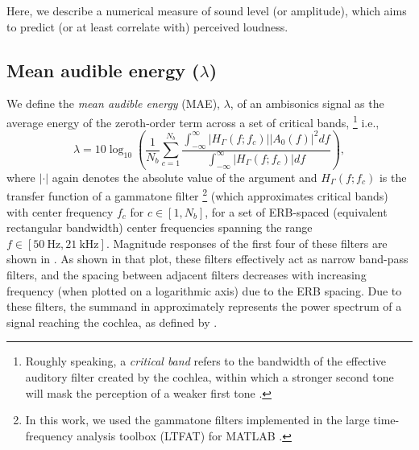 Here, we describe a numerical measure of sound level (or amplitude), which aims to predict (or at least correlate with) perceived loudness.

\subsection{Mean audible energy (\texorpdfstring{$\lambda$}{lambda})}\label{sec:04_Auditory_Models:Audible_Energy}
We define the \textit{mean audible energy} (MAE), $\lambda$, of an ambisonics signal as the average energy of the zeroth-order term across a set of critical bands,%
\footnote{Roughly speaking, a \textit{critical band} refers to the bandwidth of the effective auditory filter created by the cochlea, within which a stronger second tone will mask the perception of a weaker first tone \citep[chapter 3]{Moore2013}.}
 i.e.,
\begin{equation}\label{eq:04_Auditory_Models:Mean_Audible_Energy}
\lambda = 10 \log_{10} \left( \frac{1}{N_b} \sum_{c = 1}^{N_b} \frac{\displaystyle \int_{-\infty}^\infty |H_\Gamma(f;f_c)| |A_0(f)|^2 df}{\displaystyle \int_{-\infty}^\infty |H_\Gamma(f;f_c)| df} \right),
\end{equation}
where $|\cdot|$ again denotes the absolute value of the argument and $H_\Gamma(f;f_c)$ is the transfer function of a gammatone filter%
\footnote{In this work, we used the gammatone filters implemented in the large time-frequency analysis toolbox (LTFAT) for MATLAB \citep{LTFATURL}.} (which approximates critical bands) with center frequency $f_c$ for $c \in [1, N_b]$, for a set of ERB-spaced (equivalent rectangular bandwidth) center frequencies \citep{GlasbergMoore1990} spanning the range $f \in [50~\text{Hz}, 21~\text{kHz}]$.
Magnitude responses of the first four of these filters are shown in .
As shown in that plot, these filters effectively act as narrow band-pass filters, and the spacing between adjacent filters decreases with increasing frequency (when plotted on a logarithmic axis) due to the ERB spacing.
Due to these filters, the summand in  approximately represents the power spectrum of a signal reaching the cochlea, as defined by \citet[Eq.~(5.12)]{Salomons1995PhD}.

